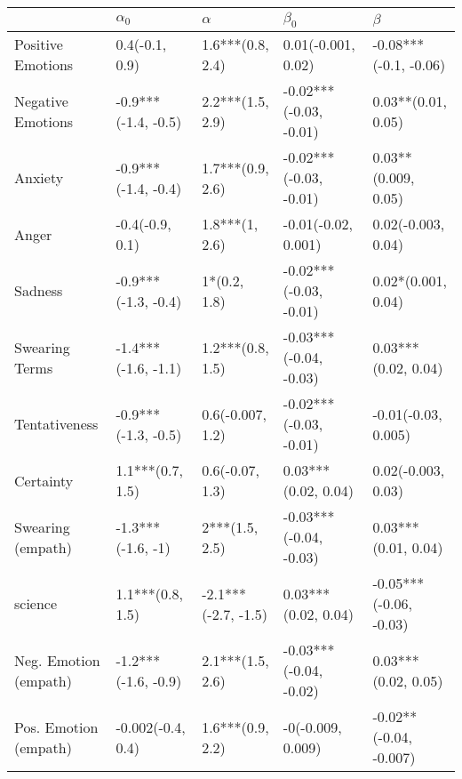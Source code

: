 \begin{tabular}{lllll}
\toprule
{} &           $\alpha_0$ &             $\alpha$ &               $\beta_0$ &                 $\beta$ \\
\midrule
Positive Emotions     &       0.4(-0.1, 0.9) &     1.6***(0.8, 2.4) &      0.01(-0.001, 0.02) &   -0.08***(-0.1, -0.06) \\
Negative Emotions     &  -0.9***(-1.4, -0.5) &     2.2***(1.5, 2.9) &  -0.02***(-0.03, -0.01) &      0.03**(0.01, 0.05) \\
Anxiety               &  -0.9***(-1.4, -0.4) &     1.7***(0.9, 2.6) &  -0.02***(-0.03, -0.01) &     0.03**(0.009, 0.05) \\
Anger                 &      -0.4(-0.9, 0.1) &       1.8***(1, 2.6) &     -0.01(-0.02, 0.001) &      0.02(-0.003, 0.04) \\
Sadness               &  -0.9***(-1.3, -0.4) &         1*(0.2, 1.8) &  -0.02***(-0.03, -0.01) &      0.02*(0.001, 0.04) \\
Swearing Terms        &  -1.4***(-1.6, -1.1) &     1.2***(0.8, 1.5) &  -0.03***(-0.04, -0.03) &     0.03***(0.02, 0.04) \\
Tentativeness         &  -0.9***(-1.3, -0.5) &     0.6(-0.007, 1.2) &  -0.02***(-0.03, -0.01) &     -0.01(-0.03, 0.005) \\
Certainty             &     1.1***(0.7, 1.5) &      0.6(-0.07, 1.3) &     0.03***(0.02, 0.04) &      0.02(-0.003, 0.03) \\
Swearing (empath)     &    -1.3***(-1.6, -1) &       2***(1.5, 2.5) &  -0.03***(-0.04, -0.03) &     0.03***(0.01, 0.04) \\
science               &     1.1***(0.8, 1.5) &  -2.1***(-2.7, -1.5) &     0.03***(0.02, 0.04) &  -0.05***(-0.06, -0.03) \\
Neg. Emotion (empath) &  -1.2***(-1.6, -0.9) &     2.1***(1.5, 2.6) &  -0.03***(-0.04, -0.02) &     0.03***(0.02, 0.05) \\
Pos. Emotion (empath) &    -0.002(-0.4, 0.4) &     1.6***(0.9, 2.2) &       -0(-0.009, 0.009) &  -0.02**(-0.04, -0.007) \\
\bottomrule
\end{tabular}
